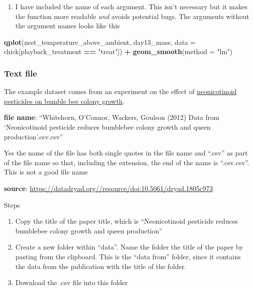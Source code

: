 \documentclass[]{book}
\newenvironment{Shaded}{\begin{snugshade}}{\end{snugshade}}
\newcommand{\DataTypeTok}[1]{\textcolor[rgb]{0.13,0.29,0.53}{#1}}
\newcommand{\KeywordTok}[1]{\textcolor[rgb]{0.13,0.29,0.53}{\textbf{#1}}}
\newcommand{\NormalTok}[1]{#1}
\newcommand{\OperatorTok}[1]{\textcolor[rgb]{0.81,0.36,0.00}{\textbf{#1}}}
\newcommand{\StringTok}[1]{\textcolor[rgb]{0.31,0.60,0.02}{#1}}
\providecommand{\tightlist}{%
  \setlength{\itemsep}{0pt}\setlength{\parskip}{0pt}}
\begin{document}
\begin{enumerate}
\def\labelenumi{\arabic{enumi}.}
\setcounter{enumi}{3}
\tightlist
\item
  I have included the name of each argument. This isn't necessary but it makes the function more readable \emph{and} avoids potential bugs. The arguments without the argument names looks like this
\end{enumerate}

\begin{Shaded}
\begin{Highlighting}[]
\KeywordTok{qplot}\NormalTok{(nest_temperature_above_ambient, day13_mass, }\DataTypeTok{data =}\NormalTok{ chick[playback_treatment }\OperatorTok{==}\StringTok{ "treat"}\NormalTok{]) }\OperatorTok{+}\StringTok{ }\KeywordTok{geom_smooth}\NormalTok{(}\DataTypeTok{method =} \StringTok{"lm"}\NormalTok{)}
\end{Highlighting}
\end{Shaded}

\hypertarget{text-file}{%
\subsubsection{Text file}\label{text-file}}

The example dataset comes from an experiment on the effect of \href{http://science.sciencemag.org/content/early/2012/03/28/science.1215025}{neonicotinoid pesticides on bumble bee colony growth}.

\textbf{file name}: ``Whitehorn, O'Connor, Wackers, Goulson (2012) Data from `Neonicotinoid pesticide reduces bumblebee colony growth and queen production'.csv.csv''

Yes the name of the file has both single quotes in the file name and ``.csv'' as part of the file name so that, including the extension, the end of the name is ``.csv.csv''. This is not a good file name

\textbf{source}: \url{https://datadryad.org//resource/doi:10.5061/dryad.1805c973}

Steps

\begin{enumerate}
\def\labelenumi{\arabic{enumi}.}
\tightlist
\item
  Copy the title of the paper title, which is ``Neonicotinoid pesticide reduces bumblebee colony growth and queen production''
\item
  Create a new folder within ``data''. Name the folder the title of the paper by pasting from the clipboard. This is the ``data from'' folder, since it contains the data from the publication with the title of the folder.
\item
  Download the .csv file into this folder
\end{enumerate}
\end{document}
